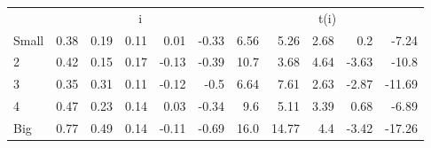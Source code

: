 \begin{table}[!ht]
\begin{tabular}{lrrrrrrrrrr}
  
    
      & \multicolumn{5}{c}{i} & \multicolumn{5}{c}{t(i)}
    
    \\
      \cmidrule(r){2-6} \cmidrule(r){7-11}

    Small   & 0.38  & 0.19  & 0.11  & 0.01  & -0.33  & 6.56  & 5.26  & 2.68  & 0.2  & -7.24  \\
         2  & 0.42  & 0.15  & 0.17  & -0.13  & -0.39  & 10.7  & 3.68  & 4.64  & -3.63  & -10.8  \\
         3  & 0.35  & 0.31  & 0.11  & -0.12  & -0.5  & 6.64  & 7.61  & 2.63  & -2.87  & -11.69  \\
         4  & 0.47  & 0.23  & 0.14  & 0.03  & -0.34  & 9.6  & 5.11  & 3.39  & 0.68  & -6.89  \\
    Big     & 0.77  & 0.49  & 0.14  & -0.11  & -0.69  & 16.0  & 14.77  & 4.4  & -3.42  & -17.26  \\

  

  \bottomrule
\end{tabular}
\label{tbl:25_Size_Beta_FF2016a}
\end{table}